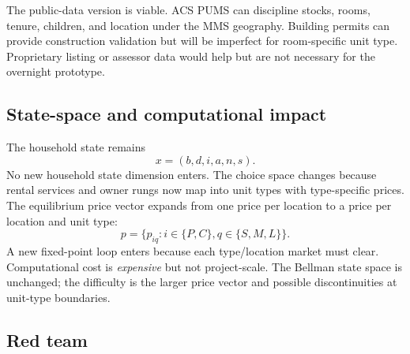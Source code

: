 \documentclass[11pt]{article}
\begin{document}
The public-data version is viable. ACS PUMS can discipline stocks, rooms, tenure, children, and location under the MMS geography. Building permits can provide construction validation but will be imperfect for room-specific unit type. Proprietary listing or assessor data would help but are not necessary for the overnight prototype.

\subsection{State-space and computational impact}

The household state remains
\begin{equation}
    x=(b,d,i,a,n,s).
\end{equation}
No new household state dimension enters. The choice space changes because rental services and owner rungs now map into unit types with type-specific prices. The equilibrium price vector expands from one price per location to a price per location and unit type:
\begin{equation}
    p=\{p_{iq}:i\in\{P,C\},q\in\{S,M,L\}\}.
\end{equation}
A new fixed-point loop enters because each type/location market must clear. Computational cost is \emph{expensive} but not project-scale. The Bellman state space is unchanged; the difficulty is the larger price vector and possible discontinuities at unit-type boundaries.

\subsection{Red team}
\end{document}

